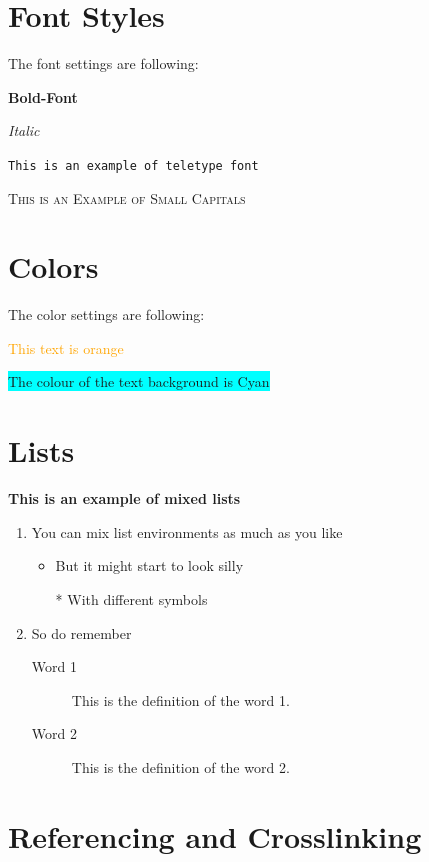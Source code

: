 \documentclass{article}
\begin{document}
\section{Font Styles}
        The font settings are following:
        
        \hfill
        
        \textbf{Bold-Font}
        
        \textit{Italic}
        
        \texttt{This is an example of teletype font} 
        
        \textsc{This is an Example of Small Capitals}
\section{Colors}
    The color settings are following:
    
    \textcolor{orange}{This text is orange}
    
    \colorbox{cyan}{The colour of the text background is Cyan}
    
    \pagecolor{yellow}{The colour of the background page is yellow}
    \newpage
    \pagecolor{white}

\section{Lists}

\textbf{This is an example of mixed lists}

\begin{enumerate}
    \item You can mix list environments as much as you like
    \begin{itemize}
        \item But it might start to look silly
        \item[*] With different symbols
    \end{itemize}
    \item So do remember
    \begin{description}
        \item[Word 1] This is the definition of the word 1.
        \item[Word 2] This is the definition of the word 2.
    \end{description}
\end{enumerate}

\section{Referencing and Crosslinking}
\end{document}
